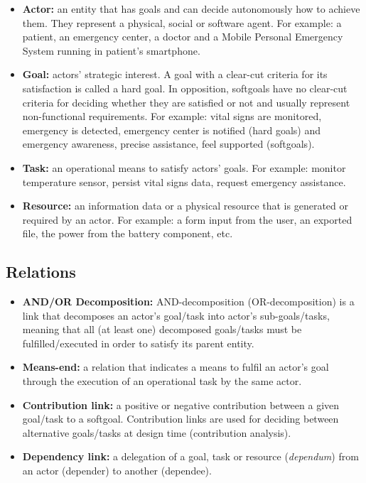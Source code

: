 \begin{itemize}

\item \textbf{Actor:} an entity that has goals and can decide autonomously how to achieve them. They represent a physical, social or software agent. For example: a patient, an emergency center, a doctor and a Mobile Personal Emergency System running in patient's smartphone.
\medskip

\item \textbf{Goal:} actors' strategic interest. A goal with a clear-cut criteria for its satisfaction is called a hard goal. In opposition, softgoals have no clear-cut criteria for deciding whether they are satisfied or not and usually represent non-functional requirements. For example: vital signs are monitored, emergency is detected, emergency center is notified (hard goals) and emergency awareness, precise assistance, feel supported (softgoals).
\medskip

\item \textbf{Task:} an operational means to satisfy actors' goals. For example: monitor temperature sensor, persist vital signs data, request emergency assistance.
\medskip

\item \textbf{Resource:} an information data or a physical resource that is generated or required by an actor. For example: a form input from the user, an exported file, the power from the battery component, etc.

\end{itemize}


\subsection{Relations}

\begin{itemize}

\item \textbf{AND/OR Decomposition:} AND-decomposition (OR-decomposition) is a link that decomposes an actor's goal/task into actor's sub-goals/tasks, meaning that all (at least one) decomposed goals/tasks must be fulfilled/executed in order to satisfy its parent entity. 
\medskip

\item \textbf{Means-end:} a relation that indicates a means to fulfil an actor's goal through the execution of an operational task by the same actor.
\medskip

\item \textbf{Contribution link:} a positive or negative contribution between a given goal/task to a softgoal. Contribution links are used for deciding between alternative goals/tasks at design time (contribution analysis).
\medskip

\item \textbf{Dependency link:} a delegation of a goal, task or resource (\textit{dependum}) from an actor (depender) to another (dependee).

\end{itemize}

